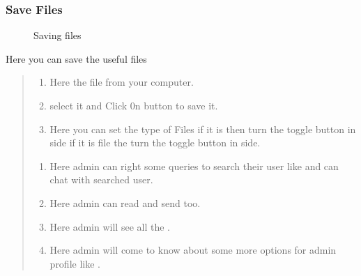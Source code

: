 \documentclass[a4paper,10pt,english]{report}
\begin{document}
\subsubsection{Save Files}
\label{\detokenize{adminlogedin:save-files}}
\begin{figure}[htbp]
\centering
\capstart

\noindent{}
\caption{Saving files}\label{\detokenize{adminlogedin:id4}}\label{\detokenize{adminlogedin:id2}}\end{figure}

Here you can save the useful files
\begin{quote}
\begin{enumerate}
\def\theenumi{\alph{enumi}}
\def\labelenumi{\theenumi .}
\makeatletter\def\p@enumii{\p@enumi \theenumi .}\makeatother
\item {} 
Here  the file from your computer.

\item {} 
select it and Click 0n  button to save it.

\item {} 
Here you can set the type of Files if it is  then turn the toggle button in  side if it is  file the turn the toggle button in  side.

\end{enumerate}
\begin{enumerate}
\def\theenumi{\arabic{enumi}}
\def\labelenumi{\theenumi .}
\makeatletter\def\p@enumii{\p@enumi \theenumi .}\makeatother
\setcounter{enumi}{7}
\item {} 
Here admin can right some queries  to search their user like  and can chat with searched user.

\item {} 
Here admin can read  and send too.

\item {} 
Here admin will see all the .

\item {} 
Here admin will come to know about some more options for admin profile like .

\end{enumerate}
\end{quote}
\end{document}
